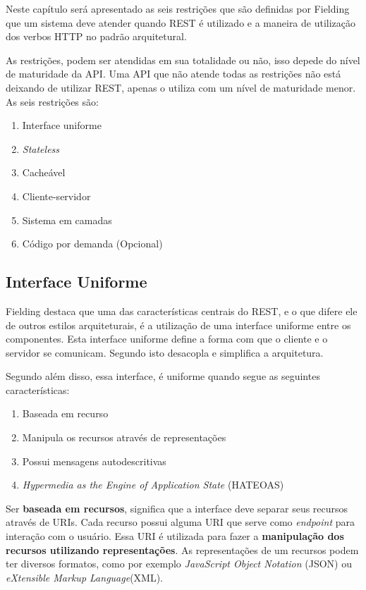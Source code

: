Neste capítulo será apresentado as seis restrições que são definidas por Fielding
que um sistema deve atender quando REST é utilizado e a maneira de utilização dos
verbos HTTP no padrão arquitetural. 

As restrições, podem ser atendidas em sua totalidade
ou não, isso depede do nível de maturidade da API. Uma API que não atende todas as restrições
não está deixando de utilizar REST, apenas o utiliza com um nível de maturidade
menor. As seis restrições são:

\begin{enumerate}
  \item Interface uniforme
  \item \textit{Stateless}
  \item Cacheável
  \item Cliente-servidor
  \item Sistema em camadas
  \item Código por demanda (Opcional)
\end{enumerate}

\subsection{Interface Uniforme}

Fielding \cite{fielding} destaca que uma das características centrais do REST, e o que difere ele 
de outros estilos arquiteturais, é a utilização de uma interface uniforme entre os componentes. 
Esta interface uniforme define a forma com que o cliente e o servidor se comunicam. Segundo \cite{todd}
isto desacopla e simplifica a arquitetura.

Segundo \cite{todd} além disso, essa interface, é uniforme quando segue as seguintes características:

\begin{enumerate}
  \item Baseada em recurso
  \item Manipula os recursos através de representações
  \item Possui mensagens autodescritivas
  \item \textit{Hypermedia as the Engine of Application State} (HATEOAS)
\end{enumerate}

Ser \textbf{baseada em recursos}, significa que a interface deve separar seus
recursos através de URIs. 
Cada recurso possui alguma URI que serve como \textit{endpoint} para interação com o usuário. 
Essa URI é utilizada para fazer a \textbf{manipulação dos recursos utilizando representações}.
As representações de um recursos podem ter diversos formatos, como por exemplo 
\textit{JavaScript Object Notation} (JSON) ou \textit{eXtensible Markup Language}(XML).

